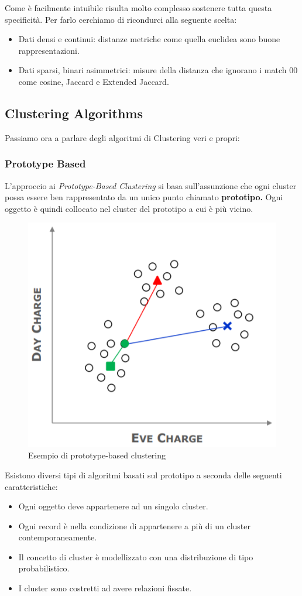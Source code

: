 Come è facilmente intuibile risulta molto complesso sostenere tutta questa specificità. Per farlo cerchiamo di ricondurci alla seguente scelta:
\begin{itemize}
	\item Dati densi e continui: distanze metriche  come quella euclidea sono buone rappresentazioni.
	\item Dati sparsi, binari asimmetrici: misure della distanza che ignorano i match 00 come cosine, Jaccard e Extended Jaccard.
\end{itemize}

\subsection{Clustering Algorithms}
Passiamo ora a parlare degli algoritmi di Clustering veri e propri:
\subsubsection{Prototype Based}

L'approccio ai  \textit{Prototype-Based Clustering} si basa sull'assunzione che ogni cluster possa essere ben rappresentato da un unico punto chiamato \textbf{prototipo.} Ogni oggetto è quindi collocato nel cluster del prototipo a cui è più vicino.

\begin{figure}[H]
	\centering
	\includegraphics[height=0.4 \linewidth]{clustering/pict/prototype_cluster.png}
	\caption{Esempio di prototype-based clustering}
\end{figure}
Esistono diversi tipi di algoritmi basati sul prototipo a seconda delle seguenti caratteristiche:

\begin{itemize}
	\item Ogni oggetto deve appartenere ad un singolo cluster.
	\item Ogni record è nella condizione di appartenere a più di un cluster contemporaneamente.
	\item Il concetto di cluster è modellizzato con una distribuzione di tipo probabilistico.
	\item I cluster sono costretti ad avere relazioni fissate.
\end{itemize}

